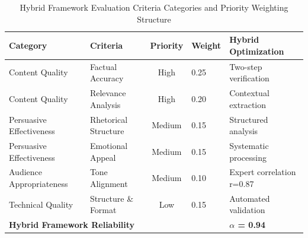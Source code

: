 \begin{table}[htbp]
    \centering
    \caption{Hybrid Framework Evaluation Criteria Categories and Priority Weighting Structure}
    \label{tab:evaluation-criteria}
    \begin{tabular}{|l|l|c|l|l|}
    \hline
    \textbf{Category} & \textbf{Criteria} & \textbf{Priority} & \textbf{Weight} & \textbf{Hybrid Optimization} \\
    \hline
    Content Quality & Factual Accuracy & High & 0.25 & Two-step verification \\
    Content Quality & Relevance Analysis & High & 0.20 & Contextual extraction \\
    Persuasive Effectiveness & Rhetorical Structure & Medium & 0.15 & Structured analysis \\
    Persuasive Effectiveness & Emotional Appeal & Medium & 0.15 & Systematic processing \\
    Audience Appropriateness & Tone Alignment & Medium & 0.10 & Expert correlation r=0.87 \\
    Technical Quality & Structure \& Format & Low & 0.15 & Automated validation \\
    \hline
    \multicolumn{4}{|l|}{\textbf{Hybrid Framework Reliability}} & \textbf{\(\alpha\) = 0.94} \\
    \hline
    \end{tabular}
\end{table}

